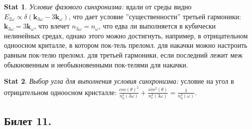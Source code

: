 \documentclass[a4paper,12pt]{article}
\theoremstyle{definition} %
\newtheorem{Stat}{Stat}[section]
\theoremstyle{definition} %
\theoremstyle{remark} %
\begin{document}
\begin{Stat}\label{stat \theStat}
	\textit{Условие фазового синхронизма:} вдали от среды видно $E_{2\omega} \propto \delta(\mathbf{k}_{3\omega}-3\mathbf{k}_{\omega})$, что дает условие ''существенности'' третьей гармоники: $\mathbf{k}_{3\omega}=3\mathbf{k}_{\omega}$, что влечет $n_{3\omega}=n_{\omega}$, что едва ли выполняется в кубически нелинейных средах, однако этого можно достигнуть, например, в отрицательном одноосном криталле, в котором пок-тель преломл. для накачки можно настроить равным пок-телю преломл. для третьей гармоники, если последний лежит меж обыкновенным и необыкновенными пок-телями для накачки.
\end{Stat}
\begin{Stat}\label{stat \theStat}
	\textit{Выбор угла для выполнения условия синхронизма:} условие на угол в отрицательном одноосном кристалле: $\frac{cos(\theta)^{2}}{n_{0}^{2}(3\omega)} + \frac{sin^{2}(\theta)}{n_{e}^{2}(3\omega)} = \frac{1}{n_{0}^{2}(\omega)}$.
\end{Stat}

\subsection{Билет 11.}
\end{document}
